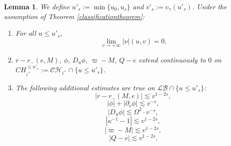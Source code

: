 \documentclass[10pt,a4paper]{article}
\theoremstyle{plain}
\newtheorem{lem}[thm]{Lemma}
\theoremstyle{remark}
\theoremstyle{definition}
\theoremstyle{plain}
\theoremstyle{remark}
\theoremstyle{definition}
\newcommand{\LB}{\mathcal{LB}}
\newcommand{\CH}{\mathcal{CH}_{i^+}}
\numberwithin{equation}{section}
\begin{document}
\begin{lem} \label{<us}We define $u'_s:= \min \{ u_0, u_s\}$ and $v'_s:=v_{\gamma}(u'_s)$. Under the assumption of Theorem \ref{classificationtheorem}: \begin{enumerate}
		\item For all $u \leq u'_s$, $$\lim_{v \rightarrow +\infty}|\nu|(u,v)=0.$$
		\item $r-r_-(e,M)$, $\phi$, $D_u \phi$, $\varpi-M$, $Q-e$ extend continuously to $0$ on  $CH^{\leq u'_s}_{i^+}:=\CH \cap \{ u \leq u'_s\}$.
		\item The following additional estimates are true on $\LB \cap \{ u \leq u'_s\}$:   \begin{equation} \label{ropt}
		|r-r_-(M,e)| \lesssim v^{1-2s},
		\end{equation} 
		\begin{equation} \label{phiopt}
		|\phi|+ |\partial_v \phi| \lesssim v^{-s},
		\end{equation}  	\begin{equation} \label{Duphi2}
		|D_u \phi| \lesssim \Omega^2 \cdot v^{-s},
		\end{equation} 
		\begin{equation} \label{kappaopt}
		|\kappa^{-1}-1| \lesssim v^{1-2s},
		\end{equation} \begin{equation} \label{massopt}
		|\varpi-M| \lesssim v^{1-2s},
		\end{equation} \begin{equation} \label{Qopt}
		|Q-e| \lesssim v^{1-2s}.
		\end{equation}
	\end{enumerate}
	
\end{lem}
\end{document}
